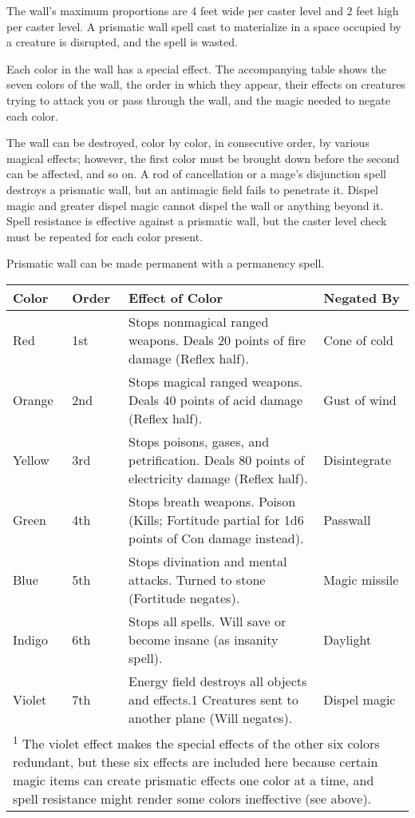 \begin{multicols}{2}
\begin{small}
\smallskip\noindent The wall's maximum proportions are 4 feet wide per caster level and 2 feet high per caster level. A prismatic wall spell cast to materialize in a space occupied by a creature is disrupted, and the spell is wasted.

\smallskip\noindent Each color in the wall has a special effect. The accompanying table shows the seven colors of the wall, the order in which they appear, their effects on creatures trying to attack you or pass through the wall, and the magic needed to negate each color.

\smallskip\noindent The wall can be destroyed, color by color, in consecutive order, by various magical effects; however, the first color must be brought down before the second can be affected, and so on. A rod of cancellation or a mage's disjunction spell destroys a prismatic wall, but an antimagic field fails to penetrate it. Dispel magic and greater dispel magic cannot dispel the wall or anything beyond it. Spell resistance is effective against a prismatic wall, but the caster level check must be repeated for each color present.

\smallskip\noindent Prismatic wall can be made permanent with a permanency spell.

\begin{center}
\begin{tabular}[h!]{p{.35in}|p{.25in}|p{1.5in}|p{.5in}}
Color  & Order & Effect of Color & Negated By	\\ \hline
Red    & 1st & Stops nonmagical ranged weapons. Deals 20 points of fire damage (Reflex half). & Cone of cold \\
Orange & 2nd & Stops magical ranged weapons. Deals 40 points of acid damage (Reflex half). & Gust of wind	\\
Yellow & 3rd & Stops poisons, gases, and petrification. Deals 80 points of electricity damage (Reflex half). & Disintegrate	\\
Green  & 4th & Stops breath weapons. Poison (Kills; Fortitude partial for 1d6 points of Con damage instead). & Passwall	\\
Blue   & 5th & Stops divination and mental attacks. Turned to stone (Fortitude negates). & Magic missile \\
Indigo & 6th & Stops all spells. Will save or become insane (as insanity spell). & Daylight	\\
Violet & 7th & Energy field destroys all objects and effects.1 Creatures sent to another plane (Will negates). & Dispel magic	\\
\multicolumn{4}{p{3in}}{\textsuperscript{1} The violet effect makes the special effects of the other six colors redundant, but these six effects are included here because certain magic items can create prismatic effects one color at a time, and spell resistance might render some colors ineffective (see above).} \\
\end{tabular}
\end{center}


\end{small}
\end{multicols}
